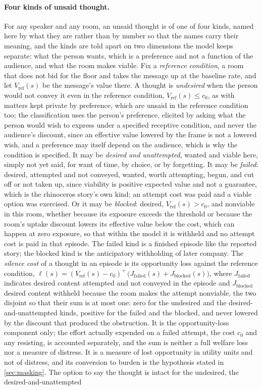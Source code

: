 \paragraph{Four kinds of unsaid thought.} For any speaker and any room, an unsaid thought is of one of four kinds, named here by what they are rather than by number so that the names carry their meaning, and the kinds are told apart on two dimensions the model keeps separate: what the person wants, which is a preference and not a function of the audience, and what the room makes viable. Fix a \emph{reference condition}, a room that does not bid for the floor and takes the message up at the baseline rate, and let $V_{\mathrm{ref}}(s)$ be the message's value there. A thought is \emph{undesired} when the person would not convey it even in the reference condition, $V_{\mathrm{ref}}(s) \le c_0$, as with matters kept private by preference, which are unsaid in the reference condition too; the classification uses the person's preference, elicited by asking what the person would wish to express under a specified receptive condition, and never the audience's discount, since an effective value lowered by the frame is not a lowered wish, and a preference may itself depend on the audience, which is why the condition is specified. It may be \emph{desired and unattempted}, wanted and viable here, simply not yet said, for want of time, by choice, or by forgetting. It may be \emph{failed}: desired, attempted and not conveyed, wanted, worth attempting, begun, and cut off or not taken up, since viability is positive expected value and not a guarantee, which is the rhinoceros story's own kind; an attempt cost was paid and a viable option was exercised. Or it may be \emph{blocked}: desired, $V_{\mathrm{ref}}(s) > c_0$, and nonviable in this room, whether because its exposure exceeds the threshold or because the room's uptake discount lowers its effective value below the cost, which can happen at zero exposure, so that within the model it is withheld and no attempt cost is paid in that episode. The failed kind is a finished episode like the reported story; the blocked kind is the anticipatory withholding of later company. The \emph{silence cost} of a thought in an episode is its opportunity loss against the reference condition, $\ell(s) = (V_{\mathrm{ref}}(s) - c_0)^{+}\,\big(J_{\mathrm{failed}}(s) + J_{\mathrm{blocked}}(s)\big)$, where $J_{\mathrm{failed}}$ indicates desired content attempted and not conveyed in the episode and $J_{\mathrm{blocked}}$ desired content withheld because the room makes the attempt nonviable, the two disjoint so that their sum is at most one: zero for the undesired and the desired-and-unattempted kinds, positive for the failed and the blocked, and never lowered by the discount that produced the obstruction. It is the opportunity-loss component only; the effort actually expended on a failed attempt, the cost $c_0$ and any resisting, is accounted separately, and the sum is neither a full welfare loss nor a measure of distress. It is a measure of lost opportunity in utility units and not of distress, and its conversion to burden is the hypothesis stated in \autoref{sec:masking}. The option to say the thought is intact for the undesired, the desired-and-unattempted 